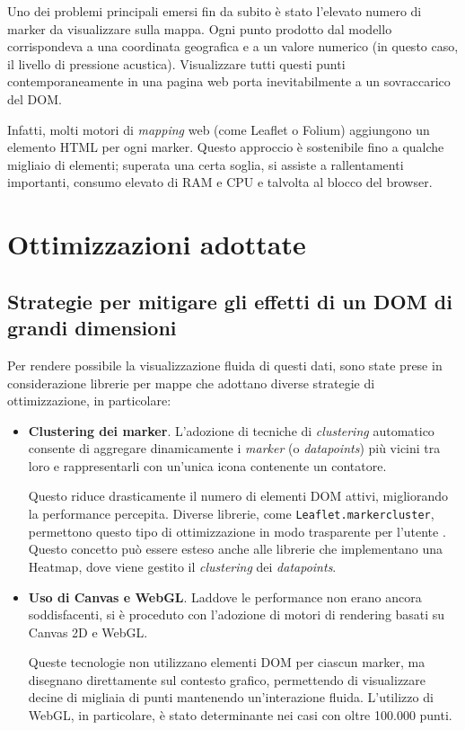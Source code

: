Uno dei problemi principali emersi fin da subito è stato l'elevato numero di
marker da visualizzare sulla mappa. Ogni punto prodotto dal modello corrispondeva
a una coordinata geografica e a un valore numerico (in questo caso, il livello di
pressione acustica). Visualizzare tutti questi punti contemporaneamente in una pagina
web porta inevitabilmente a un sovraccarico del DOM.

Infatti, molti motori di \textit{mapping} web (come Leaflet o Folium) aggiungono
un elemento HTML per ogni marker. Questo approccio è sostenibile fino a qualche
migliaio di elementi; superata una certa soglia, si assiste a rallentamenti
importanti, consumo elevato di RAM e CPU e talvolta al blocco del browser.
\cite{folium-react}

\section{Ottimizzazioni adottate}

\subsection{Strategie per mitigare gli effetti di un DOM di grandi dimensioni}

Per rendere possibile la visualizzazione fluida di questi dati, sono state prese
in considerazione librerie per mappe che adottano diverse strategie di
ottimizzazione, in particolare:

\begin{itemize}
  \item \textbf{Clustering dei marker}. L'adozione di tecniche di \textit{clustering}
    automatico consente di aggregare dinamicamente i \textit{marker} (o \textit{datapoints})
    più vicini tra loro e rappresentarli con un'unica icona contenente un
    contatore.

    Questo riduce drasticamente il numero di elementi DOM attivi, migliorando la
    performance percepita. Diverse librerie, come \texttt{Leaflet.markercluster},
    permettono questo tipo di ottimizzazione in modo trasparente per l'utente \cite{leaflet-clustering}.
    Questo concetto può essere esteso anche alle librerie che implementano una
    Heatmap, dove viene gestito il \textit{clustering} dei \textit{datapoints}.

  \item \textbf{Uso di Canvas e WebGL}. Laddove le performance non erano ancora soddisfacenti,
    si è proceduto con l'adozione di motori di rendering basati su Canvas 2D e
    WebGL.

    Queste tecnologie non utilizzano elementi DOM per ciascun marker, ma disegnano
    direttamente sul contesto grafico, permettendo di visualizzare decine di
    migliaia di punti mantenendo un'interazione fluida. L'utilizzo di WebGL, in
    particolare, è stato determinante nei casi con oltre 100.000 punti.
    \cite{deckgl-webgl}
\end{itemize}